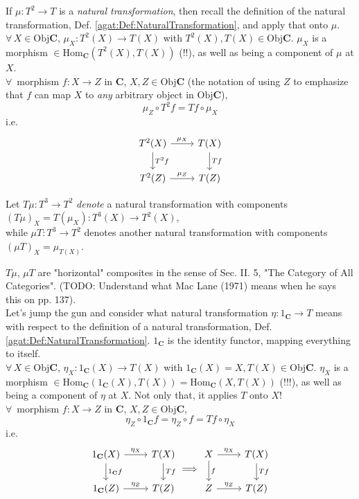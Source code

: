 If $\mu:T^2 \to T$ is a \emph{natural transformation}, then recall the definition of the natural transformation, Def. \ref{agat:Def:NaturalTransformation}, and apply that onto $\mu$. \\

$\forall \, X \in \text{Obj}{\mathbf{C}}$, $\mu_X: T^2(X) \to T(X)$ with $T^2(X), T(X) \in \text{Obj}{\mathbf{C}}$. $\mu_X$ is a morphism $\in \text{Hom}_{\mathbf{C}}(T^2(X), T(X))$ (!!), as well as being a component of $\mu$ at $X$. \\

$\forall \,$ morphism $f: X\to Z$ in $\mathbf{C}$, $X, Z \in \text{Obj}{\mathbf{C}}$ (the notation of using $Z$ to emphasize that $f$ can map $X$ to \emph{any} arbitrary object in $\text{Obj}{\mathbf{C}}$), 
\[
\mu_Z \circ T^2f = Tf \circ \mu_X 
\]
i.e. 
\[
\begin{tikzcd}
	T^2(X) \arrow{d}{T^2f} \arrow{r}{\mu_X} & T(X) \arrow{d}{Tf} \\
	T^2(Z) \arrow{r}{\mu_Z} & T(Z)
\end{tikzcd}
\]

Let $T\mu : T^3 \to T^2$ \emph{denote} a natural transformation with components $(T\mu)_X = T(\mu_X) : T^3(X) \to T^2(X)$, \\
while $\mu T: T^3\to T^2$ denotes another natural transformation with components $(\mu T)_X  = \mu_{T(X)}$.  

$T\mu$, $\mu T$ are "horizontal" composites in the sense of Sec. II. 5, "The Category of All Categories". (TODO: Understand what Mac Lane (1971) \cite{agat:MacL1978} means when he says this on pp. 137). \\

Let's jump the gun and consider what natural transformation $\eta : 1_{\mathbf{C}} \to T$ means with respect to the definition of a natural transformation, Def. \ref{agat:Def:NaturalTransformation}. $1_{\mathbf{C}}$ is the identity functor, mapping everything to itself. \\

$\forall \, X \in \text{Obj}{\mathbf{C}}$, $\eta_X: 1_{\mathbf{C}}(X) \to T(X)$ with $1_{\mathbf{C}}(X) = X, T(X) \in \text{Obj}{\mathbf{C}}$. $\eta_X$ is a morphism $\in \text{Hom}_{\mathbf{C}}(1_{\mathbf{C}}(X), T(X)) = \text{Hom}_{\mathbf{C}}(X, T(X))$ (!!!), as well as being a component of $\eta$ at $X$. Not only that, it applies $T$ onto $X$! \\

$\forall \,$ morphism $f: X\to Z$ in $\mathbf{C}$, $X, Z \in \text{Obj}{\mathbf{C}}$, 
\[
\eta_Z \circ 1_{\mathbf{C}}f = \eta_Z \circ f = Tf \circ \eta_X 
\]
i.e. 
\[
\begin{tikzcd}
1_{\mathbf{C}}(X) \arrow{d}{1_{\mathbf{C}}f} \arrow{r}{\eta_X} & T(X) \arrow{d}{Tf} \\
1_{\mathbf{C}}(Z) \arrow{r}{\eta_Z} & T(Z)
\end{tikzcd} \Longrightarrow 
\begin{tikzcd}
X \arrow{d}{f} \arrow{r}{\eta_X} & T(X) \arrow{d}{Tf} \\
Z \arrow{r}{\eta_Z} & T(Z)
\end{tikzcd}
\]

